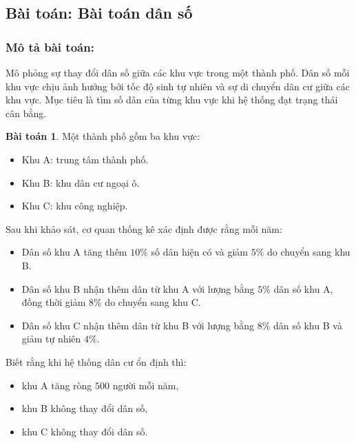 \documentclass[12pt,a4paper,oneside]{book}
\theoremstyle{theorem}
\theoremstyle{definition}
\newtheorem{bt}[theorem2]{Bài toán}
\begin{document}
\subsection{Bài toán: Bài toán dân số}
\subsubsection{Mô tả bài toán:}
Mô phỏng sự thay đổi dân số giữa các khu vực trong một thành phố. Dân số
mỗi khu vực chịu ảnh hưởng bởi tốc độ sinh tự nhiên và sự di chuyển dân cư
giữa các khu vực. Mục tiêu là tìm số dân của từng khu vực khi hệ thống đạt
trạng thái cân bằng.
\begin{bt}
    Một thành phố gồm ba khu vực:

\begin{itemize}
    \item Khu A: trung tâm thành phố.
    
    \item Khu B: khu dân cư ngoại ô.
    
    \item Khu C: khu công nghiệp.
\end{itemize}

Sau khi khảo sát, cơ quan thống kê xác định được rằng mỗi năm:

\begin{itemize}
    \item Dân số khu A tăng thêm \(10\%\) số dân hiện có và giảm \(5\%\) do chuyển sang khu B.
    
    \item Dân số khu B nhận thêm dân từ khu A với lượng bằng \(5\%\) dân số khu A,
    đồng thời giảm \(8\%\) do chuyển sang khu C.
    
    \item Dân số khu C nhận thêm dân từ khu B với lượng bằng \(8\%\) dân số khu B
    và giảm tự nhiên \(4\%\).
\end{itemize}

Biết rằng khi hệ thống dân cư ổn định thì:

\begin{itemize}
    \item khu A tăng ròng \(500\) người mỗi năm,
    
    \item khu B không thay đổi dân số,
    
    \item khu C không thay đổi dân số.
\end{itemize}


\end{bt}
\end{document}
